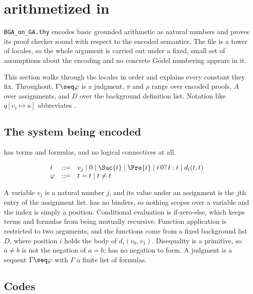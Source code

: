 \section{\BGA{} arithmetized in \QGA}
\label{sec:bga}

\texttt{BGA\_on\_GA.thy} encodes basic grounded arithmetic as \QGA{} natural
numbers and proves its proof checker sound with respect to the encoded
semantics.  The file is a tower of locales, so the whole argument is carried
out under a fixed, small set of assumptions about the encoding and no concrete
G\"odel numbering appears in it.

This section walks through the locales in order and explains every constant
they fix.  Throughout, $\Gamma \seq \varphi$ is a \BGA{} judgment, $\pi$ and
$\rho$ range over encoded proofs, $A$ over assignments, and $D$ over the
background definition list.  Notation like $q[v_i \mapsto a]$ abbreviates
.

\subsection{The system being encoded}

\BGA{} has terms and formulas, and no logical connectives at all.

\[
\begin{array}{lcl}
t &::=& v_j \mid 0 \mid \Suc{t} \mid \Pre{t} \mid t\,0?\,t : t \mid d_i(t, t)\\
\varphi &::=& t = t \mid t \neq t
\end{array}
\]

\noindent
A variable $v_j$ is a natural number $j$, and its value under an assignment is
the $j$th entry of the assignment list.  \BGA{} has no binders, so nothing
scopes over a variable and the index is simply a position.  Conditional
evaluation is if-zero-else, which keeps terms and formulas from being mutually
recursive.  Function application is restricted to two arguments, and the
functions come from a fixed background list $D$, where position $i$ holds the
body of $d_i(v_0, v_1)$.  Disequality is a primitive, so $a \neq b$ is not the
negation of $a = b$; \BGA{} has no negation to form.  A judgment is a sequent
$\Gamma \seq \varphi$ with $\Gamma$ a finite list of formulas.

\subsection{Codes}

